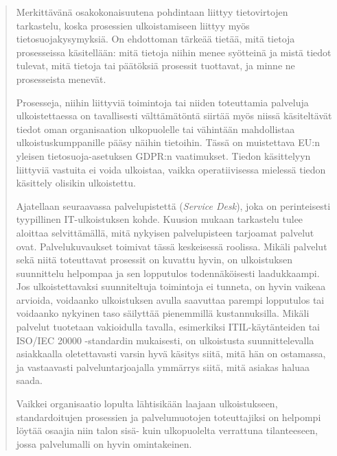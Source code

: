 \documentclass[
  finnish,
  letterpaper,
  DIV=11,
  numbers=noendperiod,
  oneside]{scrreprt}
\begin{document}
\begin{quote}
Merkittävänä osakokonaisuutena pohdintaan liittyy tietovirtojen
tarkastelu, koska prosessien ulkoistamiseen liittyy myös
tietosuojakysymyksiä. On ehdottoman tärkeää tietää, mitä tietoja
prosesseissa käsitellään: mitä tietoja niihin menee syötteinä ja mistä
tiedot tulevat, mitä tietoja tai päätöksiä prosessit tuottavat, ja minne
ne prosesseista menevät.

Prosesseja, niihin liittyviä toimintoja tai niiden toteuttamia palveluja
ulkoistettaessa on tavallisesti välttämätöntä siirtää myös niissä
käsiteltävät tiedot oman organisaation ulkopuolelle tai vähintään
mahdollistaa ulkoistuskumppanille pääsy näihin tietoihin. Tässä on
muistettava EU:n yleisen tietosuoja-asetuksen GDPR:n vaatimukset. Tiedon
käsittelyyn liittyviä vastuita ei voida ulkoistaa, vaikka
operatiivisessa mielessä tiedon käsittely olisikin ulkoistettu.

Ajatellaan seuraavassa palvelupistettä
(\emph{Service Desk}), joka on perinteisesti tyypillinen IT-ulkoistuksen
kohde. Kuusion mukaan tarkastelu tulee aloittaa selvittämällä, mitä
nykyisen palvelupisteen tarjoamat palvelut ovat. Palvelukuvaukset
toimivat tässä keskeisessä roolissa. Mikäli palvelut sekä niitä
toteuttavat prosessit on kuvattu hyvin, on ulkoistuksen suunnittelu
helpompaa ja sen lopputulos todennäköisesti laadukkaampi. Jos
ulkoistettavaksi suunniteltuja toimintoja ei tunneta, on hyvin vaikeaa
arvioida, voidaanko ulkoistuksen avulla saavuttaa parempi lopputulos tai
voidaanko nykyinen taso säilyttää pienemmillä kustannuksilla. Mikäli
palvelut tuotetaan vakioidulla tavalla, esimerkiksi ITIL-käytänteiden
tai ISO/IEC 20000
-standardin mukaisesti, on ulkoistusta suunnittelevalla asiakkaalla
oletettavasti varsin hyvä käsitys siitä, mitä hän on ostamassa, ja
vastaavasti palveluntarjoajalla ymmärrys siitä, mitä asiakas haluaa
saada.

Vaikkei organisaatio lopulta lähtisikään laajaan ulkoistukseen,
standardoitujen prosessien ja palvelumuotojen toteuttajiksi on helpompi
löytää osaajia niin talon sisä- kuin ulkopuolelta verrattuna
tilanteeseen, jossa palvelumalli on hyvin omintakeinen.


\end{quote}
\end{document}
